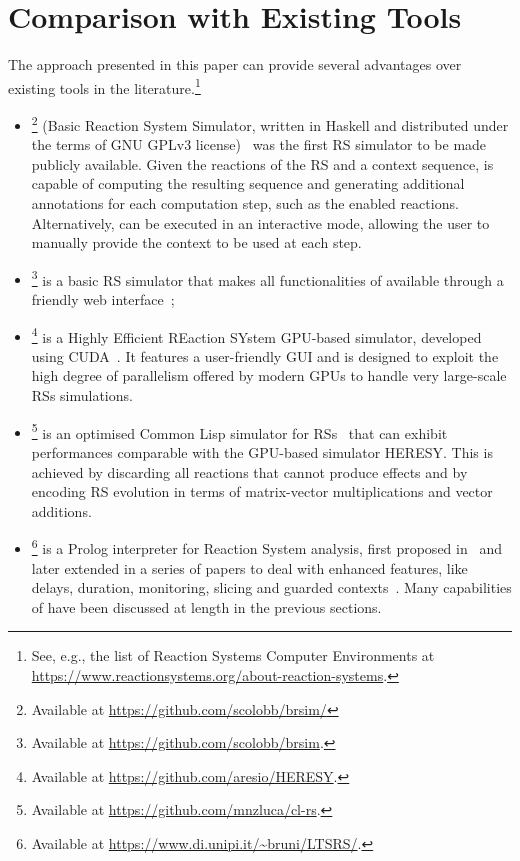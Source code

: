 
\section{Comparison with Existing Tools}\label{sec:related}

The approach presented in this paper can provide several advantages over existing tools in the literature.\footnote{See, e.g., the list of Reaction Systems Computer Environments at \url{https://www.reactionsystems.org/about-reaction-systems}.}
\begin{itemize}
\item
\brsim\footnote{Available at \url{https://github.com/scolobb/brsim/}} (Basic Reaction System Simulator, written in Haskell and distributed under the terms of GNU GPLv3 license)~\cite{DBLP:journals/tcs/AzimiGIP15} was the first RS simulator to be made publicly available. 
Given the reactions of the RS and a context sequence, \brsim is capable of computing the resulting sequence and generating additional annotations for each computation step, such as the enabled reactions.
Alternatively, \brsim can be executed in an interactive mode, allowing the user to manually provide the context to be used at each step.
\item
\WebRSim\footnote{Available at \url{https://github.com/scolobb/brsim}.} is a basic RS simulator that makes all functionalities of  \brsim available through a friendly web interface~\cite{DBLP:conf/birthday/0001RAP18};
\item 
\HERESY\footnote{Available at \url{https://github.com/aresio/HERESY}.} is a Highly Efficient REaction SYstem GPU-based simulator, developed using CUDA~\cite{DBLP:journals/fuin/NobilePSMCMB17}. It features a user-friendly GUI and is designed to exploit the high degree of parallelism offered by modern GPUs to handle very large-scale RSs simulations.
\item
\clrs\footnote{Available at \url{https://github.com/mnzluca/cl-rs}.} is an optimised Common Lisp simulator for RSs~\cite{DBLP:journals/fuin/FerrettiLMP20} that can exhibit performances comparable with the GPU-based simulator \textsf{HERESY}. This is achieved by discarding all reactions that cannot produce effects and by encoding RS evolution in terms of matrix-vector multiplications and vector additions.
\item 
\BioResolve\footnote{Available at \url{https://www.di.unipi.it/~bruni/LTSRS/}.} is a Prolog interpreter for Reaction System analysis, first proposed in~\cite{DBLP:journals/tcs/BrodoBF21} and later extended in a series of papers to deal with enhanced features, like delays, duration, monitoring, slicing and guarded contexts~\cite{DBLP:journals/nca/BrodoBFGLM23,DBLP:journals/nc/BrodoBF24,DBLP:conf/cmsb/BowlesBBFGM24}. Many capabilities of \BioResolve have been discussed at length in the previous sections.

\end{itemize}
